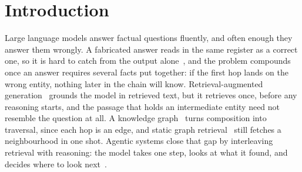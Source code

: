%
%
%

\section{Introduction}\label{sec:intro}

Large language models answer factual questions fluently, and often
enough they answer them wrongly. A fabricated answer reads in the same
register as a correct one, so it is hard to catch from the output
alone~\cite{huang2025survey}, and the problem compounds once an answer
requires several facts put together: if the first hop lands on the wrong
entity, nothing later in the chain will know. Retrieval-augmented
generation~\cite{lewis2020retrieval} grounds the model in retrieved
text, but it retrieves once, before any reasoning starts, and the
passage that holds an intermediate entity need not resemble the question
at all. A knowledge graph~\cite{bollacker2008freebase} turns composition
into traversal, since each hop is an edge, and static graph
retrieval~\cite{edge2024local} still fetches a neighbourhood in one
shot. Agentic systems close that gap by interleaving retrieval with
reasoning: the model takes one step, looks at what it found, and decides
where to look
next~\cite{sun2024think,chen2024plan,luo2024reasoning,luo2025kbqao1}.

